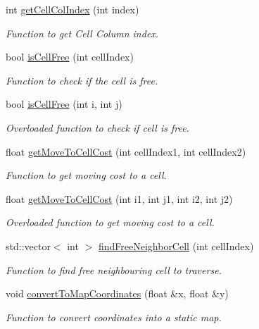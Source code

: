 \begin{DoxyCompactItemize}
int \hyperlink{classastar__plugin_1_1_a_star_planner_a7242cadadc720feb8af97bc9f427f53c}{get\+Cell\+Col\+Index} (int index)
\begin{DoxyCompactList}\small\item\em Function to get Cell Column index. \end{DoxyCompactList}\item 
bool \hyperlink{classastar__plugin_1_1_a_star_planner_a29d81e8f4ac6191296d5c180be9ac8ae}{is\+Cell\+Free} (int cell\+Index)
\begin{DoxyCompactList}\small\item\em Function to check if the cell is free. \end{DoxyCompactList}\item 
bool \hyperlink{classastar__plugin_1_1_a_star_planner_ae8f5105e002f679874c3d55815fe30ad}{is\+Cell\+Free} (int i, int j)
\begin{DoxyCompactList}\small\item\em Overloaded function to check if cell is free. \end{DoxyCompactList}\item 
float \hyperlink{classastar__plugin_1_1_a_star_planner_ad07f32fd3a1e44ef3bb9bb1e59237023}{get\+Move\+To\+Cell\+Cost} (int cell\+Index1, int cell\+Index2)
\begin{DoxyCompactList}\small\item\em Function to get moving cost to a cell. \end{DoxyCompactList}\item 
float \hyperlink{classastar__plugin_1_1_a_star_planner_a2f19049be7428c445b7159cc111b4401}{get\+Move\+To\+Cell\+Cost} (int i1, int j1, int i2, int j2)
\begin{DoxyCompactList}\small\item\em Overloaded function to get moving cost to a cell. \end{DoxyCompactList}\item 
std\+::vector$<$ int $>$ \hyperlink{classastar__plugin_1_1_a_star_planner_a5ea485f93bfba47034d611b04eba2189}{find\+Free\+Neighbor\+Cell} (int cell\+Index)
\begin{DoxyCompactList}\small\item\em Function to find free neighbouring cell to traverse. \end{DoxyCompactList}\item 
void \hyperlink{classastar__plugin_1_1_a_star_planner_ac43f501b17770643240a6e36174a73b9}{convert\+To\+Map\+Coordinates} (float \&x, float \&y)
\begin{DoxyCompactList}\small\item\em Function to convert coordinates into a static map. \end{DoxyCompactList}\item 

\end{DoxyCompactItemize}
